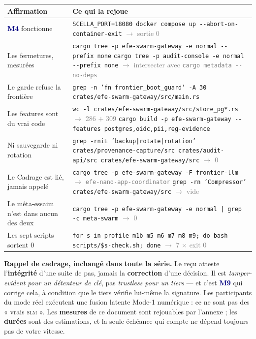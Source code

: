 \documentclass[10pt]{article}
\newcommand{\sz}[1]{\textcolor{grey}{\small\textsf{#1}}}
\newcommand{\code}[1]{\texttt{\small #1}}
\newcommand{\x}{$\times$}
\newcommand{\fl}{$\rightarrow$}
\newcommand{\mm}[1]{\textbf{\textcolor{navy}{#1}}}
\begin{document}
\renewcommand{\arraystretch}{1.22}
\begin{center}\small
\begin{tabular}{@{}>{\raggedright\arraybackslash}p{5.0cm} >{\raggedright\arraybackslash}p{11.0cm}@{}}
\toprule
\textbf{Affirmation} & \textbf{Ce qui la rejoue} \\
\midrule
\mm{M4} fonctionne &
  \code{SCELLA\_PORT=18080 docker compose up -{}-abort-on-container-exit} \sz{\fl{} sortie 0} \\
Les fermetures, mesurées &
  \code{cargo tree -p efe-swarm-gateway -e normal -{}-prefix none} \newline
  \code{cargo tree -p audit-console -e normal -{}-prefix none} \sz{\fl{} intersecter avec \code{cargo metadata -{}-no-deps}} \\
Le garde refuse la frontière &
  \code{grep -n 'fn frontier\_boot\_guard' -A 30 crates/efe-swarm-gateway/src/main.rs} \\
Les features sont du vrai code &
  \code{wc -l crates/efe-swarm-gateway/src/store\_pg*.rs} \sz{\fl{} 286 $+$ 309} \newline
  \code{cargo build -p efe-swarm-gateway -{}-features postgres,oidc,pii,reg-evidence} \\
Ni sauvegarde ni rotation &
  \code{grep -rniE 'backup|rotate|rotation' crates/provenance-capture/src crates/audit-api/src crates/efe-swarm-gateway/src} \sz{\fl{} 0} \\
Le Cadrage est lié, jamais appelé &
  \code{cargo tree -p efe-swarm-gateway -F frontier-llm} \sz{\fl{} \code{efe-nano-app-coordinator}} \newline
  \code{grep -rn 'Compressor' crates/efe-swarm-gateway/src} \sz{\fl{} vide} \\
Le méta-essaim n'est dans aucun des deux &
  \code{cargo tree -p efe-swarm-gateway -e normal | grep -c meta-swarm} \sz{\fl{} 0} \\
Les sept scripts sortent 0 &
  \code{for s in profile m1b m5 m6 m7 m8 m9; do bash scripts/\$s-check.sh; done} \sz{\fl{} 7 \x{} exit 0} \\
\bottomrule
\end{tabular}
\end{center}

\begin{these}
\small\textbf{Rappel de cadrage, inchangé dans toute la série.} Le reçu atteste l'\textbf{intégrité}
d'une suite de pas, jamais la \textbf{correction} d'une décision. Il est \emph{tamper-evident pour un
détenteur de clé}, pas \emph{trustless pour un tiers} --- et c'est \mm{M9} qui corrige cela, à
condition que le tiers vérifie lui-même la signature. Les participants du mode réel exécutent une
fusion latente Mode-1 numérique : ce ne sont pas des « vrais \textsc{slm} ». Les \textbf{mesures} de
ce document sont rejouables par l'annexe ; les \textbf{durées} sont des estimations, et la seule
échéance qui compte ne dépend toujours pas de votre vitesse.
\end{these}
\end{document}
